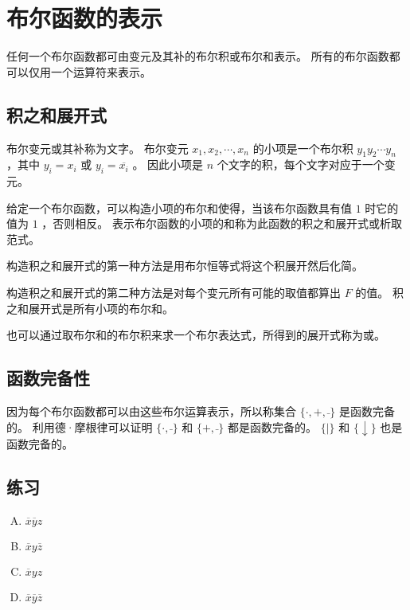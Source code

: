 
\section{布尔函数的表示}
{
    任何一个布尔函数都可由变元及其补的布尔积或布尔和表示。
    所有的布尔函数都可以仅用一个运算符来表示。

    \subsection{积之和展开式}
    {
        \begin{defines}
            布尔变元或其补称为文字。
            布尔变元 $x_1, x_2, \cdots, x_n$ 的小项是一个布尔积 $y_1y_2\cdots y_n$ ，其中 $y_i = x_i$ 或 $y_i = \overline{x_i}$ 。
            因此小项是 $n$ 个文字的积，每个文字对应于一个变元。
        \end{defines}

        给定一个布尔函数，可以构造小项的布尔和使得，当该布尔函数具有值 $1$ 时它的值为 $1$ ，否则相反。
        表示布尔函数的小项的和称为此函数的积之和展开式或析取范式。

        构造积之和展开式的第一种方法是用布尔恒等式将这个积展开然后化简。

        构造积之和展开式的第二种方法是对每个变元所有可能的取值都算出 $F$ 的值。
        积之和展开式是所有小项的布尔和。

        也可以通过取布尔和的布尔积来求一个布尔表达式，所得到的展开式称为或。
    }

    \subsection{函数完备性}
    {
        因为每个布尔函数都可以由这些布尔运算表示，所以称集合 $\{\cdot, +, \bar{}\}$ 是函数完备的。
        利用德·摩根律可以证明 $\{\cdot, \bar{}\}$ 和 $\{+, \bar{}\}$ 都是函数完备的。
        $\{|\}$ 和 $\{\downarrow\}$ 也是函数完备的。
    }

    \subsection{练习}
    {
        \begin{practices}
            \begin{enumerate}[A.]
                \item $\overline{x}\overline{y}z$
                \item $\overline{x}y\overline{z}$
                \item $\overline{x}yz$
                \item $\overline{x}\overline{y}\overline{z}$
            \end{enumerate}
        \end{practices}

}}
